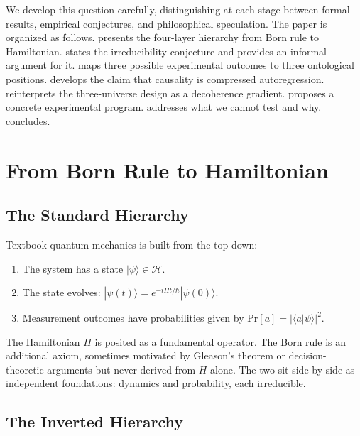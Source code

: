 \documentclass[12pt,a4paper]{article}
\theoremstyle{definition}
\theoremstyle{remark}
\newcommand{\Hil}{\mathcal{H}}
\newcommand{\ket}[1]{|#1\rangle}
\newcommand{\braket}[2]{\langle#1|#2\rangle}
\newcommand{\Prob}{\mathrm{Pr}}
\begin{document}
We develop this question carefully, distinguishing at each stage
between formal results, empirical conjectures, and philosophical
speculation.  The paper is organized as follows.
 presents the four-layer hierarchy from Born
rule to Hamiltonian.   states the
irreducibility conjecture and provides an informal argument for it.
 maps three possible experimental outcomes
to three ontological positions.   develops the
claim that causality is compressed autoregression.
 reinterprets the three-universe design as a
decoherence gradient.   proposes a concrete
experimental program.   addresses what we cannot
test and why.   concludes.


\section{From Born Rule to Hamiltonian}
\label{sec:born-to-H}

\subsection{The Standard Hierarchy}

Textbook quantum mechanics is built from the top down:

\begin{enumerate}[label=(\roman*)]
  \item The system has a state $\ket{\psi} \in \Hil$.
  \item The state evolves: $\ket{\psi(t)} = e^{-iHt/\hbar}\ket{\psi(0)}$.
  \item Measurement outcomes have probabilities given by
        $\Prob[a] = |\braket{a}{\psi}|^2$.
\end{enumerate}

The Hamiltonian $H$ is posited as a fundamental operator.  The Born
rule is an additional axiom, sometimes motivated by Gleason's theorem
or decision-theoretic arguments but never derived from $H$ alone.
The two sit side by side as independent foundations: dynamics and
probability, each irreducible.

\subsection{The Inverted Hierarchy}
\end{document}
